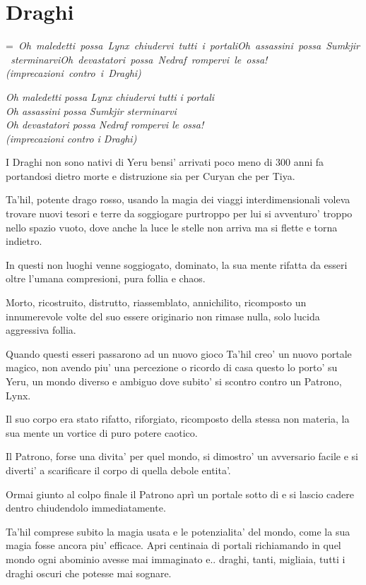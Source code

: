 \documentclass[a4paper,11pt,twoside,openany]{book}
\makeatletter
\newcommand{\mybox}[1]{%
	\setbox0=\hbox{#1}%
	\setlength{\@tempdima}{\dimexpr\wd0+13pt}%
	\begin{tcolorbox}[boxrule=0.5pt,arc=4pt, breakable,enhanced,
		left=6pt,right=6pt,top=6pt,bottom=6pt,boxsep=0pt,width=\@tempdima]
		#1
	\end{tcolorbox}
}
\makeatother
\begin{document}
{\begin{tabular}{ll}
\end{tabular}

\pagebreak

\section{Draghi}
\label{draghi}

\mybox{\textit{
			Oh maledetti possa Lynx chiudervi tutti i portali\\
			Oh assassini possa Sumkjir sterminarvi\\
			Oh devastatori possa Nedraf rompervi le ossa!\\
			(imprecazioni contro i Draghi)
}}\medskip

I Draghi non sono nativi di Yeru bensi' arrivati poco meno di 300 anni fa portandosi dietro morte e distruzione sia per Curyan che per Tiya.

Ta'hil, potente drago rosso, usando la magia dei viaggi interdimensionali voleva trovare nuovi tesori e terre da soggiogare purtroppo per lui si avventuro' troppo nello spazio vuoto, dove anche la luce le stelle non arriva ma si flette e torna indietro.

In questi non luoghi venne soggiogato, dominato, la sua mente rifatta da esseri oltre l'umana compresioni, pura follia e chaos.

Morto, ricostruito, distrutto, riassemblato, annichilito, ricomposto un innumerevole volte del suo essere originario non rimase nulla, solo lucida aggressiva follia.

Quando questi esseri passarono ad un nuovo gioco Ta'hil creo' un nuovo portale magico, non avendo piu' una percezione o ricordo di casa questo lo porto' su Yeru, un mondo diverso e ambiguo dove subito' si scontro contro un Patrono, Lynx.

Il suo corpo era stato rifatto, riforgiato, ricomposto della stessa non materia, la sua mente un vortice di puro potere caotico.

Il Patrono, forse una divita' per quel mondo, si dimostro' un avversario facile e si diverti' a scarificare il corpo di quella debole entita'.

Ormai giunto al colpo finale il Patrono aprì un portale sotto di e si lascio cadere dentro chiudendolo immediatamente.

Ta'hil comprese subito la magia usata e le potenzialita' del mondo, come la sua magia fosse ancora piu' efficace.
Apri centinaia di portali richiamando in quel mondo ogni abominio avesse mai immaginato e.. draghi, tanti, migliaia, tutti i draghi oscuri che potesse mai sognare.

}
\end{document}
